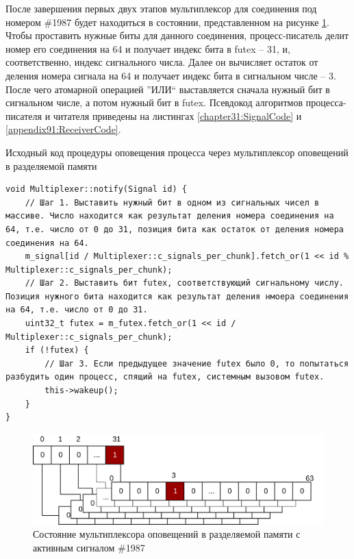 После завершения первых двух этапов мультиплексор для соединения под номером \#1987 будет находиться в состоянии, представленном на рисунке \ref{chapter31:Mux1987State}. Чтобы проставить нужные биты для данного соединения, процесс-писатель делит номер его соединения на 64 и получает индекс бита в futex -- 31, и, соответственно, индекс сигнального числа. Далее он вычисляет остаток от деления номера сигнала на 64 и получает индекс бита в сигнальном числе -- 3. После чего атомарной операцией ''ИЛИ`` выставляется сначала нужный бит в сигнальном числе, а потом нужный бит в futex. Псевдокод алгоритмов процесса-писателя и читателя приведены на листингах \ref{chapter31:SignalCode} и \ref{appendix91:ReceiverCode}.

\begin{algorithm}[!h]
\caption{Исходный код процедуры оповещения процесса через мультиплексор оповещений в разделяемой памяти}
\label{chapter31:SignalCode}
\begin{lstlisting}[frame=tlrb]
void Multiplexer::notify(Signal id) {
	// Шаг 1. Выставить нужный бит в одном из сигнальных чисел в массиве. Число находится как результат деления номера соединения на 64, т.е. число от 0 до 31, позиция бита как остаток от деления номера соединения на 64.
	m_signal[id / Multiplexer::c_signals_per_chunk].fetch_or(1 << id % Multiplexer::c_signals_per_chunk);
    // Шаг 2. Выставить бит futex, соответствующий сигнальному числу. Позиция нужного бита находится как результат деления нмоера соединения на 64, т.е. число от 0 до 31.
	uint32_t futex = m_futex.fetch_or(1 << id / Multiplexer::c_signals_per_chunk);
	if (!futex) {
		// Шаг 3. Если предыдущее значение futex было 0, то попытаться разбудить один процесс, спящий на futex, системным вызовом futex.
		this->wakeup();
	}
}
\end{lstlisting}
\end{algorithm}

\begin{figure}[!h]
\caption{Состояние мультиплексора оповещений в разделяемой памяти с активным сигналом \#1987}
\label{chapter31:Mux1987State}
\includegraphics[width=\textwidth]{../../graphics/schemes/futexready}
\end{figure}

